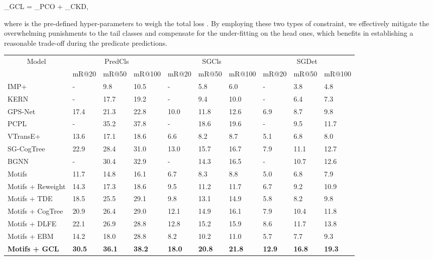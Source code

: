 \documentclass[10pt,twocolumn,letterpaper]{article}
\begin{document}
{	_{GCL} = _{PCO} + \alpha{}_{CKD},

where  is the pre-defined hyper-parameters to weigh the total loss . By employing these two types of constraint, we effectively mitigate the overwhelming punishments to the tail classes and compensate for the under-fitting on the head ones, which benefits in establishing a reasonable trade-off during the predicate predictions.




\begin{table*}[t]
	\small
	\vspace{-0.4cm}
	\begin{tabular}{p{2.9cm}|p{1.1cm}<{\centering}p{1.1cm}<{\centering}p{1.1cm}<{\centering}|p{1.1cm}<{\centering}p{1.1cm}<{\centering}p{1.1cm}<{\centering}|p{1.1cm}<{\centering}p{1.1cm}<{\centering}p{1.1cm}<{\centering}}
		\hline
		\multicolumn{1}{c|}{\multirow{2}{*}{Model}} & \multicolumn{3}{c|}{PredCls}& \multicolumn{3}{c|}{SGCls}& \multicolumn{3}{c}{SGDet}\\ \cline{2-10} 
		\multicolumn{1}{c|}{}& \multicolumn{1}{c}{mR@20} & \multicolumn{1}{c}{mR@50} & \multicolumn{1}{c|}{mR@100} & \multicolumn{1}{c}{mR@20} & \multicolumn{1}{c}{mR@50} & \multicolumn{1}{c|}{mR@100} & \multicolumn{1}{c}{mR@20} & \multicolumn{1}{c}{mR@50} & \multicolumn{1}{c}{mR@100} \\ \hline
		
		IMP+ & -  &9.8  &10.5 &-  &5.8  &6.0 &-  & 3.8 &4.8 \\
		KERN & -  &17.7  &19.2 &-  &9.4  &10.0 &-  & 6.4 &7.3 \\
		GPS-Net & 17.4  &21.3  &22.8 &10.0  &11.8  &12.6 &6.9  & 8.7 &9.8 \\
		PCPL & -  &35.2  &37.8 &-  &18.6  &19.6 &-  & 9.5 &11.7 \\
		VTransE+ &13.6  &17.1  &18.6 &6.6  &8.2  &8.7 &5.1  & 6.8 &8.0 \\
	    SG-CogTree & 22.9  &28.4  &31.0 &13.0  &15.7  &16.7 &7.9  & 11.1 &12.7 \\
		BGNN & -  &30.4  &32.9 &-  &14.3  &16.5 &-  & 10.7 &12.6 \\
		
		 \hline
		
		Motifs &11.7  &14.8  &16.1 &6.7  &8.3 &8.8 &5.0  &6.8  & 7.9\\ 
		Motifs + Reweight &14.3  &17.3  &18.6 &9.5  &11.2 &11.7 &6.7  &9.2  & 10.9\\
		Motifs + TDE &18.5  &25.5  &29.1 &9.8  &13.1 &14.9 &5.8  &8.2  & 9.8\\
		Motifs + CogTree &20.9  &26.4  &29.0 &12.1  &14.9 &16.1 &7.9  &10.4  & 11.8\\
		Motifs + DLFE &22.1  &26.9  &28.8 &12.8  &15.2 &15.9 &8.6  &11.7  & 13.8\\
		Motifs + EBM &14.2  &18.0  &28.8 &8.2  &10.2 &11.0 &5.7  &7.7  & 9.3\\
		\textbf{Motifs + GCL} &\textbf{30.5}  &\textbf{36.1}  &\textbf{38.2} &\textbf{18.0}  &\textbf{20.8}  &\textbf{21.8}  &\textbf{12.9}  &\textbf{16.8}  &\textbf{19.3} \\
		\hline
		

\end{tabular}
\end{table*}}
\end{document}
